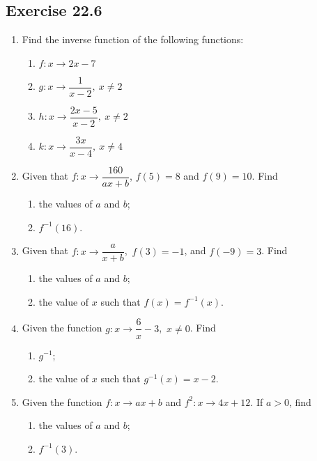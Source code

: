 \documentclass[12pt]{report}
\begin{document}
\subsection*{Exercise 22.6}

\setlength{\columnseprule}{1pt}
\setlength{\columnsep}{24pt}

\begin{multicols}{2}

  \begin{enumerate}
    \item Find the inverse function of the following functions:
          \begin{enumerate}
            \item $f:x \to 2x - 7$
            \item $g:x \to \dfrac{1}{x-2},\ x \neq 2$
            \item $h:x \to \dfrac{2x - 5}{x-2},\ x \neq 2$
            \item $k:x \to \dfrac{3x}{x-4},\ x \neq 4$
          \end{enumerate}

    \item Given that $f:x \to \dfrac{160}{ax + b}$, $f(5) = 8$ and $f(9) = 10$. Find
          \begin{enumerate}
            \item the values of $a$ and $b$;
            \item $f^{-1}(16)$.
          \end{enumerate}

    \item Given that $f:x \to \dfrac{a}{x+b}$,\ $f(3) = -1$, and $f(-9) = 3$. Find
          \begin{enumerate}
            \item the values of $a$ and $b$;
            \item the value of $x$ such that $f(x) = f^{-1}(x)$.
          \end{enumerate}

    \item Given the function $g:x \to \dfrac{6}{x} - 3$,\ $x \neq 0$. Find
          \begin{enumerate}
            \item $g^{-1}$;
            \item the value of $x$ such that $g^{-1}(x) = x - 2$.
          \end{enumerate}

    \item Given the function $f:x \to ax + b$ and $f^2: x \to 4x + 12$. If $a > 0$, find
          \begin{enumerate}
            \item the values of $a$ and $b$;
            \item $f^{-1}(3)$.
          \end{enumerate}


\end{enumerate}
\end{multicols}
\end{document}

